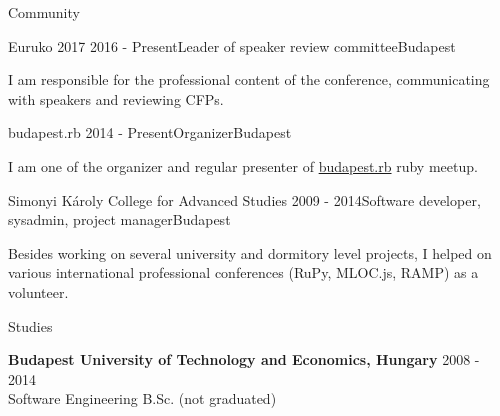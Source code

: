 \documentclass{resume} %
\begin{document}
\newpage


\begin{rSection}{Community}

\begin{rSubsection}{Euruko 2017}
{2016 - Present}{Leader of speaker review committee}{Budapest}
\item I am responsible for the professional content of the conference, communicating
with speakers and reviewing CFPs.
\end{rSubsection}

\begin{rSubsection}{budapest.rb}
{2014 - Present}{Organizer}{Budapest}
\item I am one of the organizer and regular presenter of
\href{https://www.meetup.com/budapest-rb}{budapest.rb} ruby meetup.
\end{rSubsection}

\begin{rSubsection}{Simonyi Károly College for Advanced Studies}
{2009 - 2014}{Software developer, sysadmin, project manager}{Budapest}
\item Besides working on several university and dormitory level projects, I helped
on various international professional conferences (RuPy, MLOC.js, RAMP) as a volunteer.
\end{rSubsection}

\end{rSection}


\begin{rSection}{Studies}

{\bf Budapest University of Technology and Economics, Hungary} \hfill {2008 - 2014} \\
Software Engineering B.Sc. (not graduated) \smallskip
\end{rSection}

\end{document}
